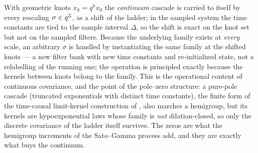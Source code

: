 \begin{remark}\label{rem:covariance-practice}
With geometric knots $x_k = q^k x_0$ the \emph{continuum} cascade is carried to itself by
every rescaling $\sigma \in q^{\mathbb{Z}}$, as a shift of the ladder; in the sampled system the
time constants are tied to the sample interval $\Delta$, so the shift is exact on the knot
set but not on the sampled filters. Because the underlying family exists at \emph{every}
scale, an arbitrary $\sigma$ is handled by instantiating the same family at the shifted
knots --- a new filter bank with new time constants and re-initialized state, not a
relabelling of the running one; the operation is principled exactly because the kernels
between knots belong to the family. This is the operational content of continuous
covariance, and the point of the pole--zero structure: a pure-pole cascade (truncated
exponentials with distinct time constants), the finite form of the time-causal limit-kernel
construction of , also marches a hemigroup, but its kernels are
hypoexponential laws whose family is \emph{not} dilation-closed, so only the discrete
covariance of the ladder itself survives. The zeros are what the hemigroup increments of the
Sato--Gamma process add, and they are exactly what buys the continuum.
\end{remark}


